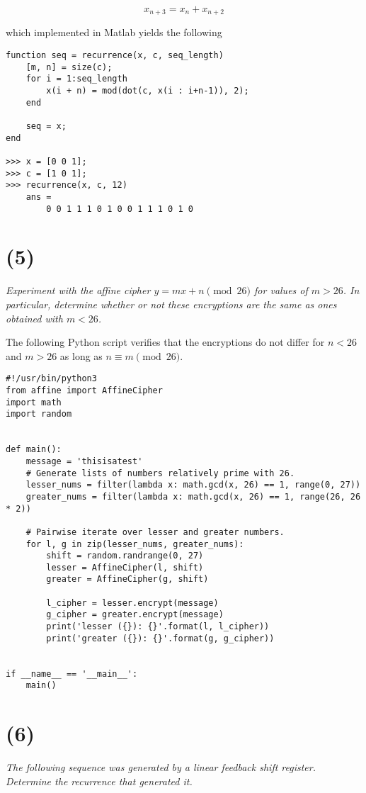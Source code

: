 \documentclass[12pt]{article}
\begin{document}
$$x_{n + 3} = x_n + x_{n + 2}$$

which implemented in Matlab yields the following

\begin{verbatim}
function seq = recurrence(x, c, seq_length)
    [m, n] = size(c);
    for i = 1:seq_length
        x(i + n) = mod(dot(c, x(i : i+n-1)), 2);
    end

    seq = x;
end

>>> x = [0 0 1];
>>> c = [1 0 1];
>>> recurrence(x, c, 12)
    ans =
        0 0 1 1 1 0 1 0 0 1 1 1 0 1 0
\end{verbatim}

\section*{(5)} \textit{Experiment with the affine cipher $y = m x + n \pmod{26}$ for values of $m > 26$. In particular, determine whether or not these encryptions are the same as ones obtained with $m < 26$.}

The following Python script verifies that the encryptions do not differ for $n < 26$ and $m > 26$ as long as $n \equiv m \pmod{26}$.

\begin{verbatim}
#!/usr/bin/python3
from affine import AffineCipher
import math
import random


def main():
    message = 'thisisatest'
    # Generate lists of numbers relatively prime with 26.
    lesser_nums = filter(lambda x: math.gcd(x, 26) == 1, range(0, 27))
    greater_nums = filter(lambda x: math.gcd(x, 26) == 1, range(26, 26 * 2))

    # Pairwise iterate over lesser and greater numbers.
    for l, g in zip(lesser_nums, greater_nums):
        shift = random.randrange(0, 27)
        lesser = AffineCipher(l, shift)
        greater = AffineCipher(g, shift)

        l_cipher = lesser.encrypt(message)
        g_cipher = greater.encrypt(message)
        print('lesser ({}): {}'.format(l, l_cipher))
        print('greater ({}): {}'.format(g, g_cipher))


if __name__ == '__main__':
    main()

\end{verbatim}

\section*{(6)} \textit{The following sequence was generated by a linear feedback shift register. Determine the recurrence that generated it.}
\end{document}
